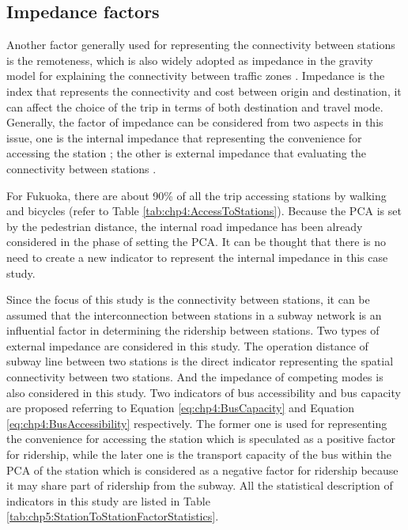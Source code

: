 %
\subsection{Impedance factors}
%
Another factor generally used for representing the connectivity between stations is the remoteness, which is also widely adopted as impedance in the gravity model for explaining the connectivity between traffic zones \cite{iwanow2007trade,kepaptsoglou2010gravity,nitsch2000national}. Impedance is the index that represents the connectivity and cost between origin and destination, it can affect the choice of the trip in terms of both destination and travel mode. Generally, the factor of impedance can be considered from two aspects in this issue, one is the internal impedance that representing the convenience for accessing the station \cite{chu2004ridership,chakraborty2013land}; the other is external impedance that evaluating the connectivity between stations \cite{sohn2010factors}.

%
For Fukuoka, there are about 90\% of all the trip accessing stations by walking and bicycles (refer to Table \ref{tab:chp4:AccessToStations}). Because the PCA is set by the pedestrian distance, the internal road impedance has been already considered in the phase of setting the PCA. It can be thought that there is no need to create a new indicator to represent the internal impedance in this case study.

%
Since the focus of this study is the connectivity between stations, it can be assumed that the interconnection between stations in a subway network is an influential factor in determining the ridership between stations. Two types of external impedance are considered in this study. The operation distance of subway line between two stations is the direct indicator representing the spatial connectivity between two stations. And the impedance of competing modes is also considered in this study. Two indicators of bus accessibility and bus capacity are proposed referring to Equation \ref{eq:chp4:BusCapacity} and Equation \ref{eq:chp4:BusAccessibility} respectively. The former one is used for representing the convenience for accessing the station which is speculated as a positive factor for ridership, while the later one is the transport capacity of the bus within the PCA of the station which is considered as a negative factor for ridership because it may share part of ridership from the subway. All the statistical description of indicators in this study are listed in Table \ref{tab:chp5:StationToStationFactorStatistics}.

